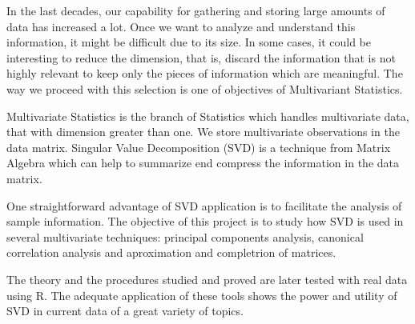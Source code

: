 In the last decades, our capability for gathering and storing large amounts of data has increased a lot. Once we want to analyze and understand this information, it might be difficult due to its size. In some cases, it could be interesting to reduce the dimension, that is, discard the information that is not highly relevant to keep only the pieces of information which are meaningful. The way we proceed with this selection is one of objectives of Multivariant Statistics.

Multivariate Statistics is the branch of Statistics which handles multivariate data, that with dimension greater than one. We store multivariate observations in the data matrix. Singular Value Decomposition (SVD) is a technique from Matrix Algebra which can help to summarize end compress the information in the data matrix.

One straightforward advantage of SVD application is to facilitate the analysis of sample information. The objective of this project is to study how SVD is used in several multivariate techniques: principal components analysis, canonical correlation analysis and aproximation and completrion of matrices.

The theory and the procedures studied and proved are later tested with real data using R. The adequate application of these tools shows the power and utility of SVD in current data of a great variety of topics.

